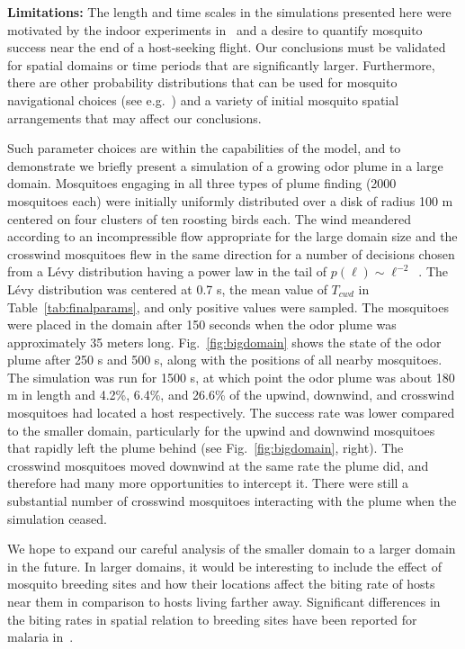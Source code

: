 \documentclass[10pt]{article}
\begin{document}
\textbf{Limitations:}
The length and time scales in the simulations presented here were motivated by the indoor experiments in~\cite{Foppa2011} and a desire to quantify mosquito success near the end of a host-seeking flight. Our conclusions must be validated for spatial domains or time periods that are significantly larger. Furthermore, there are other probability distributions that can be used for mosquito navigational choices (see e.g.~\cite{Pasternak2009}) and a variety of initial mosquito spatial arrangements that may affect our conclusions. 

Such parameter choices are within the capabilities of the model, and to demonstrate we briefly present a simulation of a growing odor plume in a large domain. Mosquitoes engaging in all three types of plume finding (2000 mosquitoes each) were initially uniformly distributed over a disk of radius 100 m centered on four clusters of ten roosting birds each. The wind meandered according to an incompressible flow appropriate for the large domain size and the crosswind mosquitoes flew in the same direction for a number of decisions chosen from a L\'{e}vy distribution having a power law in the tail of $p(\ell) \sim \ell^{-2}$~\cite{ReynoldsFrye2007}. The L\'{e}vy distribution was centered at 0.7 s, the mean value of $T_{cwd}$ in Table~\ref{tab:finalparams}, and only positive values were sampled. The mosquitoes were placed in the domain after 150 seconds when the odor plume was approximately 35 meters long. Fig.~\ref{fig:bigdomain} shows the state of the odor plume after 250 s and 500 s, along with the positions of all nearby mosquitoes. The simulation was run for 1500 s, at which point the odor plume was about 180 m in length and 4.2\%, 6.4\%, and 26.6\% of the upwind, downwind, and crosswind mosquitoes had located a host respectively. The success rate was lower compared to the smaller domain, particularly for the upwind and downwind mosquitoes that rapidly left the plume behind (see Fig.~\ref{fig:bigdomain}, right). The crosswind mosquitoes moved downwind at the same rate the plume did, and therefore had many more opportunities to intercept it. There were still a substantial number of crosswind mosquitoes interacting with the plume when the simulation ceased. 

We hope to expand our careful analysis of the smaller domain to a larger domain in the future.
In larger domains, it would be interesting to include the effect of mosquito breeding sites and how their locations affect the biting rate of hosts near them in comparison to hosts living farther away. Significant differences in the biting rates in spatial relation to breeding sites have been reported for malaria in~\cite{ThompsonEtAl1997}.  
\end{document}
